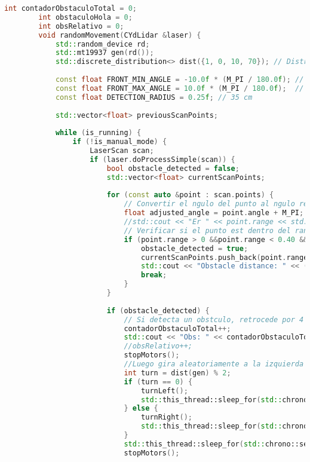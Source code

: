 \begin{lstlisting}[language={C++}, caption={Segundo ajuste de c\'odigo}, label={SegundoAjuste}]
        int contadorObstaculoTotal = 0;
        int obstaculoHola = 0;
        int obsRelativo = 0;
        void randomMovement(CYdLidar &laser) {
            std::random_device rd;
            std::mt19937 gen(rd());
            std::discrete_distribution<> dist({1, 0, 10, 70}); // Distribucin para la probabilidad de movimiento
        
            const float FRONT_MIN_ANGLE = -10.0f * (M_PI / 180.0f); // -15 grados en radaianes
            const float FRONT_MAX_ANGLE = 10.0f * (M_PI / 180.0f);  // 15 grados en radianes
            const float DETECTION_RADIUS = 0.25f; // 35 cm
        
            std::vector<float> previousScanPoints;
        
            while (is_running) {
                if (!is_manual_mode) {
                    LaserScan scan;
                    if (laser.doProcessSimple(scan)) {
                        bool obstacle_detected = false;
                        std::vector<float> currentScanPoints;
                        
                        for (const auto &point : scan.points) {
                            // Convertir el ngulo del punto al ngulo relativo al "sur" del robot
                            float adjusted_angle = point.angle + M_PI;
                            //std::cout << "Er " << point.range << std::endl;
                            // Verificar si el punto est dentro del rango frontal de 30
                            if (point.range > 0 &&point.range < 0.40 && abs(point.angle) < adjusted_angle) {
                                obstacle_detected = true;
                                currentScanPoints.push_back(point.range);
                                std::cout << "Obstacle distance: " << (float)point.range  << " Y en el angulo  "<<point.angle << std::endl;
                                break;
                            }
                        }
                        
                        if (obstacle_detected) {
                            // Si detecta un obstculo, retrocede por 4 segundos
                            contadorObstaculoTotal++;
                            std::cout << "Obs: " << contadorObstaculoTotal << std::endl;
                            //obsRelativo++;
                            stopMotors();
                            //Luego gira aleatoriamente a la izquierda o derecha
                            int turn = dist(gen) % 2;
                            if (turn == 0) {
                                turnLeft();
                                std::this_thread::sleep_for(std::chrono::seconds(5));
                            } else {
                                turnRight();
                                std::this_thread::sleep_for(std::chrono::seconds(5));
                            }
                            std::this_thread::sleep_for(std::chrono::seconds(2));
                            stopMotors();
                            

\end{lstlisting}
